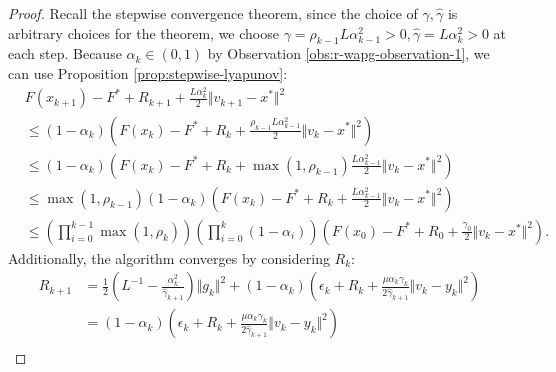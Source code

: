\documentclass[12pt]{article}
\begin{document}
    \begin{proof}  
        Recall the stepwise convergence theorem, since the choice of $\gamma, \hat \gamma$ is arbitrary choices for the theorem, we choose $\gamma = \rho_{k - 1} L \alpha_{k - 1}^2 > 0, \hat \gamma = L \alpha_k^2 > 0$ at each step. 
        Because $\alpha_k \in(0, 1)$ by Observation \ref{obs:r-wapg-observation-1}, we can use Proposition \ref{prop:stepwise-lyapunov}: 
        {\small
        \begin{align*}
            &F(x_{k + 1}) - F^* + R_{k + 1} + \frac{L \alpha_k^2}{2}\Vert v_{k + 1} - x^*\Vert^2
            \\
            &\le 
            (1 - \alpha_k)
            \left(
                F(x_k) - F^* + R_k + \frac{\rho_{k - 1}L \alpha_{k - 1}^2}{2}\Vert v_k - x^*\Vert^2
            \right)
            \\
            &\le 
            (1 - \alpha_k)
            \left(
                F(x_k) - F^* + R_k + \max(1, \rho_{k - 1})\frac{L \alpha_{k - 1}^2}{2}\Vert v_k - x^*\Vert^2
            \right)
            \\
            &\le 
            \max(1, \rho_{k - 1})(1 - \alpha_k)
            \left(
                F(x_k) - F^* + R_k + \frac{L \alpha_{k - 1}^2}{2}\Vert v_k - x^*\Vert^2
            \right)
            \\
            &\le 
            \left(
                \prod_{i = 0}^{k - 1} \max(1, \rho_{k})
            \right)
            \left(
                \prod_{i = 0}^{k} \left(1  - \alpha_i\right)
            \right)
            \left(
                F(x_0) - F^* + R_0 + \frac{\gamma_0}{2}\Vert v_k - x^*\Vert^2
            \right). 
        \end{align*}
        }
        Additionally, the algorithm converges by considering $R_k$: 
        \begin{align*}
            R_{k + 1}
            &= 
            \frac{1}{2}\left(
                L^{-1} - \frac{\alpha_k^2}{\hat \gamma_{k + 1}}
            \right)\Vert g_k\Vert^2
            + 
            (1 - \alpha_k)
            \left(
                \epsilon_k + R_k + 
                \frac{\mu\alpha_k\gamma_k}{2\hat \gamma_{k + 1}}
                \Vert v_k - y_k\Vert^2
            \right)
            \\
            &= (1 - \alpha_k)
            \left(
                \epsilon_k + R_k 
                + \frac{\mu\alpha_k\gamma_k}{2\hat \gamma_{k + 1}}
                \Vert v_k - y_k\Vert^2
            \right)
            \\

\end{align*}
\end{proof}
\end{document}

